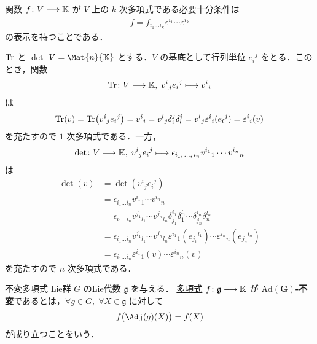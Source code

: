 \documentclass[TQFT_main]{subfiles}
\begin{document}
関数 $f \colon V \longrightarrow \mathbb{K}$ が $V$ 上の $k$-次多項式である必要十分条件は
\begin{align}
    f = f_{i_1 \dots i_k} \varepsilon^{i_1} \cdots \varepsilon^{i_k}
\end{align}
の表示を持つことである．

\begin{myexample}[]{$\Tr$ と $\det$}
    $V = \Mat{n}{\mathbb{K}}$ とする．$V$ の基底として行列単位 $e_{i}{}^{j}$ をとる．このとき，関数
    \begin{align}
        \Tr \colon V \longrightarrow \mathbb{K},\; v^{i}{}_{j} e_{i}{}^{j} \longmapsto v^{i}{}_i
    \end{align}
    は
    \begin{align}
        \Tr (v) = \Tr (v^{i}{}_{j} e_{i}{}^{j}) = v^{i}{}_i = v^l{}_j \delta^j_i \delta_l^i = v^l{}_j \varepsilon^i{}_i (e_l{}^j) =  \varepsilon^{i}{}_i (v) 
    \end{align}
    を充たすので $1$ 次多項式である．一方，
    \begin{align}
        \det \colon V \longrightarrow \mathbb{K},\; v^{i}{}_{j} e_{i}{}^{j} \longmapsto \epsilon_{i_1,\, \dots,\, i_n} v^{i_1}{}_1 \cdots v^{i_n}{}_n
    \end{align}
    は
    \begin{align}
        \det (v) 
        &= \det (v^{i}{}_{j} e_{i}{}^{j}) \\
        &= \epsilon_{i_1 \dots i_n} v^{i_1}{}_1 \cdots v^{i_n}{}_n\\
        &= \epsilon_{i_1 \dots i_n} v^{j_1}{}_{l_1} \cdots v^{j_n}{}_{l_n} \delta^{i_1}_{j_1} \delta^{l_1}_1 \cdots \delta^{i_n}_{j_n} \delta^{l_n}_n\\
        &= \epsilon_{i_1 \dots i_n} v^{j_1}{}_{l_1} \cdots v^{j_n}{}_{l_n} \varepsilon^{i_1}{}_{1} (e_{j_1}{}^{l_1}) \cdots  \varepsilon^{i_n}{}_{n} (e_{j_n}{}^{l_n}) \\
        &= \epsilon_{i_1 \dots i_n} \varepsilon^{i_1}{}_{1} (v) \cdots  \varepsilon^{i_n}{}_{n} (v)
    \end{align}
    を充たすので $n$ 次多項式である．
\end{myexample}

\begin{mydef}[label=def:invariant]{不変多項式}
    Lie群 $G$ のLie代数 $\mathfrak{g}$ を与える．
    \hyperref[def:polynomial]{多項式} $f \colon \mathfrak{g} \longrightarrow \mathbb{K}$ が $\bm{\mathrm{Ad}(G)}$\textbf{-不変}であるとは，$\forall g \in G,\; \forall X \in \mathfrak{g}$ に対して
    \begin{align}
        f \bigl( \Adj(g)(X) \bigr) = f(X) 
    \end{align}
    が成り立つことをいう．
\end{mydef}
\end{document}
